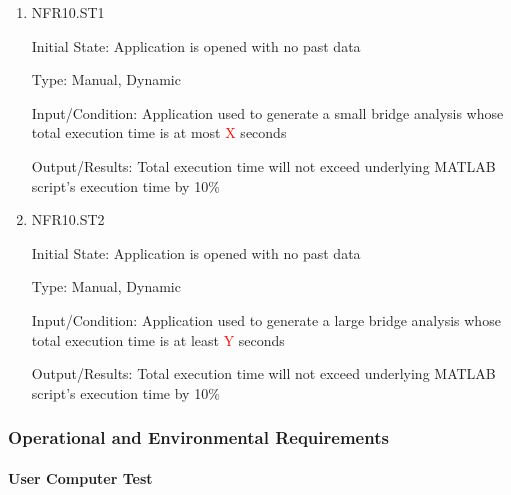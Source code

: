 \documentclass[12pt, titlepage]{article}
\begin{document}
\begin{enumerate}

\item{NFR10.ST1\\}

Initial State: Application is opened with no past data

Type: Manual, Dynamic

Input/Condition: Application used to generate a small bridge analysis whose total execution time is at most \textcolor{red}{X} seconds

Output/Results: Total execution time will not exceed underlying MATLAB script's execution time by 10\%

\item{NFR10.ST2\\}

Initial State: Application is opened with no past data

Type: Manual, Dynamic

Input/Condition: Application used to generate a large bridge analysis whose total execution time is at least \textcolor{red}{Y} seconds

Output/Results: Total execution time will not exceed underlying MATLAB script's execution time by 10\%

\end{enumerate}

\subsubsection{Operational and Environmental Requirements}
		
\paragraph{User Computer Test}
\end{document}
